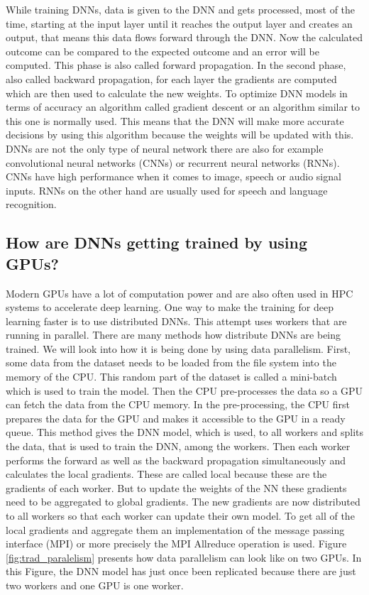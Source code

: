 \documentclass[conference]{IEEEtran}
\begin{document}
While training DNNs, data is given to the DNN and gets processed, most of the time, starting at the input layer until it reaches the output layer and creates an output, that means this data flows forward through the DNN. Now the calculated outcome can be compared to the expected outcome and an error will be computed. This phase is also called forward propagation. In the second phase, also called backward propagation, for each layer the gradients are computed which are then used to calculate the new weights. To optimize DNN models in terms of accuracy an algorithm called gradient descent or an algorithm similar to this one is normally used. This means that the DNN will make more accurate decisions by using this algorithm because the weights will be updated with this.\cite{b11}
DNNs are not the only type of neural network there are also for example convolutional neural networks (CNNs) or recurrent neural networks (RNNs). CNNs have high performance when it comes to image, speech or audio signal inputs. RNNs on the other hand are usually used for speech and language recognition.\cite{b9}

\vspace{\baselineskip}
\subsection{How are DNNs getting trained by using GPUs?}

Modern GPUs have a lot of computation power and are also often used in HPC systems to accelerate deep learning. One way to make the training for deep learning faster is to use distributed DNNs. This attempt uses workers that are running in parallel. There are many methods how distribute DNNs are being trained. We will look into how it is being done by using data parallelism. First, some data from the dataset needs to be loaded from the file system into the memory of the CPU. This random part of the dataset is called a mini-batch which is used to train the model. Then the CPU pre-processes the data so a GPU can fetch the data from the CPU memory. In the pre-processing, the CPU first prepares the data for the GPU and makes it accessible to the GPU in a ready queue. This method gives the DNN model, which is used, to all workers and splits the data, that is used to train the DNN, among the workers. Then each worker performs the forward as well as the backward propagation simultaneously and calculates the local gradients. These are called local because these are the gradients of each worker. But to update the weights of the NN these gradients need to be aggregated to global gradients. The new gradients are now distributed to all workers so that each worker can update their own model. To get all of the local gradients and aggregate them an implementation of the message passing interface (MPI) or more precisely the MPI Allreduce operation is used. Figure \ref{fig:trad_paralelism} presents how data parallelism can look like on two GPUs. In this Figure, the DNN model has just once been replicated because there are just two workers and one GPU is one worker.\cite{b11}
\end{document}
